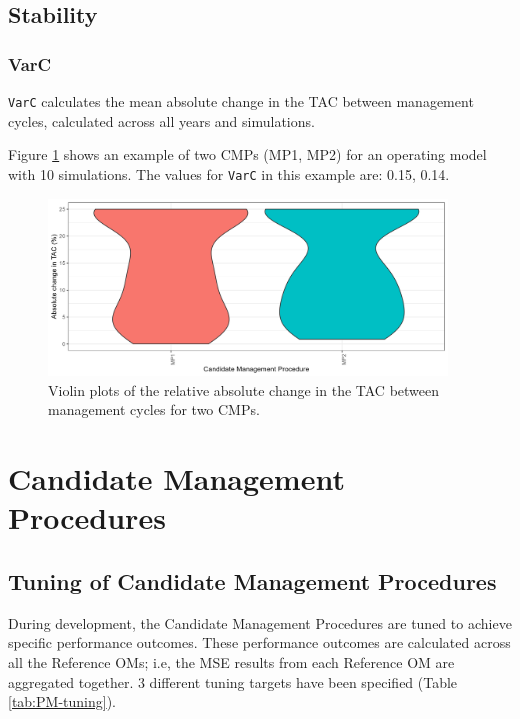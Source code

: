 \documentclass[
]{article}
\begin{document}
\hypertarget{stability}{%
\subsection{Stability}\label{stability}}

\hypertarget{varc}{%
\subsubsection{VarC}\label{varc}}

\texttt{VarC} calculates the mean absolute change in the TAC between management cycles, calculated across all years and simulations.

Figure \ref{fig:VarC} shows an example of two CMPs (MP1, MP2) for an operating model with 10 simulations. The values for \texttt{VarC} in this example are: 0.15, 0.14.

\begin{figure}
\includegraphics[width=400px]{../../img/PMs/VarC} \caption{Violin plots of the relative absolute change in the TAC between management cycles for two CMPs.}\label{fig:VarC}
\end{figure}

\hypertarget{CMPs}{%
\section{Candidate Management Procedures}\label{CMPs}}

\hypertarget{tuning}{%
\subsection{Tuning of Candidate Management Procedures}\label{tuning}}

During development, the Candidate Management Procedures are tuned to achieve specific performance outcomes. These performance outcomes are calculated across all the Reference OMs; i.e, the MSE results from each Reference OM are aggregated together. 3 different tuning targets have been specified (Table \ref{tab:PM-tuning}).
\end{document}
